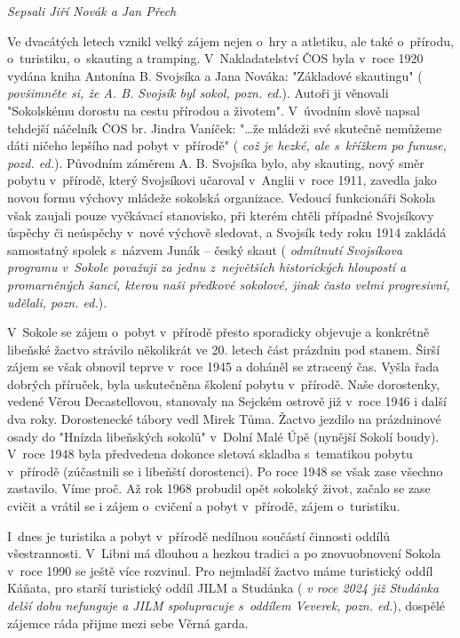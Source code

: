 \documentclass[a5paper, 11pt, twoside]{article}
\newcommand{\pozned}[1]{%
\textit{#1}}
\begin{document}
\begin{center}
  \textit{Sepsali Jiří Novák a Jan Přech}
\end{center}

Ve dvacátých letech vznikl velký zájem nejen o~hry a atletiku, ale také
o~přírodu, o~turistiku, o~skauting a tramping. V~Nakladatelství ČOS byla
v~roce 1920 vydána kniha Antonína B. Svojsíka a Jana Nováka: "Základové
skautingu" (\pozned{povšimněte si, že A. B. Svojsík byl sokol, pozn.
ed.}). Autoři ji věnovali "Sokolskému dorostu na cestu přírodou a
životem". V~úvodním slově napsal tehdejší náčelník ČOS br. Jindra
Vaníček: "\ldots{}že mládeži své skutečně nemůžeme dáti ničeho lepšího nad
pobyt v~přírodě" (\pozned{což je hezké, ale s~křížkem po funuse, pozd.
ed.}). Původním záměrem A. B. Svojsíka bylo, aby skauting, nový směr
pobytu v~přírodě, který Svojsíkovi učaroval v~Anglii v~roce 1911,
zavedla jako novou formu výchovy mládeže sokolská organizace. Vedoucí
funkcionáři Sokola však zaujali pouze vyčkávací stanovisko, při kterém
chtěli případné Svojsíkovy úspěchy či neúspěchy v~nové výchově sledovat,
a Svojsík tedy roku 1914 zakládá samostatný spolek s~názvem Junák --
český skaut (\pozned{odmítnutí Svojsíkova programu v~Sokole považuji za
jednu z~největších historických hloupostí a promarněných šancí, kterou
naši předkové sokolové, jinak často velmi progresivní, udělali, pozn.
ed.}).

V~Sokole se zájem o~pobyt v~přírodě přesto sporadicky objevuje a
konkrétně libeňské žactvo strávilo několikrát ve 20. letech část
prázdnin pod stanem. Širší zájem se však obnovil teprve v~roce 1945 a
doháněl se ztracený čas. Vyšla řada dobrých příruček, byla uskutečněna
školení pobytu v~přírodě. Naše dorostenky, vedené Věrou Decastellovou,
stanovaly na Sejckém ostrově již v~roce 1946 i další dva roky.
Dorostenecké tábory vedl Mirek Tůma. Žactvo jezdilo na prázdninové osady
do "Hnízda libeňských sokolů" v~Dolní Malé Úpě (nynější Sokolí boudy).
V~roce 1948 byla předvedena dokonce sletová skladba s~tematikou pobytu
v~přírodě (zúčastnili se i libeňští dorostenci). Po roce 1948 se však zase
všechno zastavilo. Víme proč. Až rok 1968 probudil opět sokolský život,
začalo se zase cvičit a vrátil se i zájem o~cvičení a pobyt v~přírodě,
zájem o~turistiku.

I~dnes je turistika a pobyt v~přírodě nedílnou součástí činnosti oddílů
všestrannosti. V~Libni má dlouhou a hezkou tradici a po znovuobnovení
Sokola v~roce 1990 se ještě více rozvinul. Pro nejmladší žactvo máme
turistický oddíl Káňata, pro starší turistický oddíl JILM a Studánka
(\pozned{v roce 2024 již Studánka delší dobu nefunguje a JILM spolupracuje
s~oddílem Veverek, pozn. ed.}), dospělé zájemce ráda přijme mezi sebe
Věrná garda.
\end{document}
